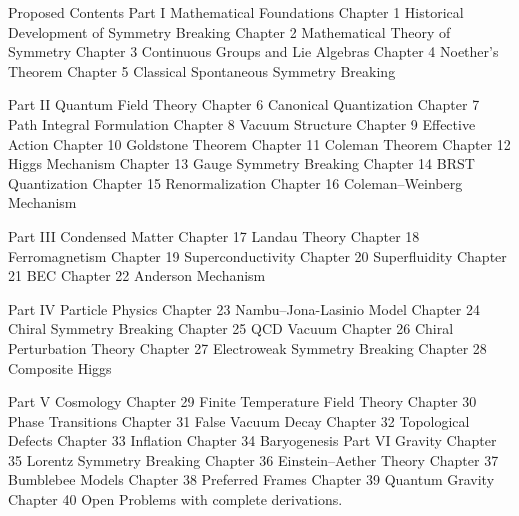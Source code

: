 Proposed Contents
Part I Mathematical Foundations
Chapter 1
Historical Development of Symmetry Breaking
Chapter 2
Mathematical Theory of Symmetry
Chapter 3
Continuous Groups and Lie Algebras
Chapter 4
Noether's Theorem
Chapter 5
Classical Spontaneous Symmetry Breaking

Part II Quantum Field Theory
Chapter 6
Canonical Quantization
Chapter 7
Path Integral Formulation
Chapter 8
Vacuum Structure
Chapter 9
Effective Action
Chapter 10
Goldstone Theorem
Chapter 11
Coleman Theorem
Chapter 12
Higgs Mechanism
Chapter 13
Gauge Symmetry Breaking
Chapter 14
BRST Quantization
Chapter 15
Renormalization
Chapter 16
Coleman–Weinberg Mechanism

Part III Condensed Matter
Chapter 17
Landau Theory
Chapter 18
Ferromagnetism
Chapter 19
Superconductivity
Chapter 20
Superfluidity
Chapter 21
BEC
Chapter 22
Anderson Mechanism

Part IV Particle Physics
Chapter 23
Nambu–Jona-Lasinio Model
Chapter 24
Chiral Symmetry Breaking
Chapter 25
QCD Vacuum
Chapter 26
Chiral Perturbation Theory
Chapter 27
Electroweak Symmetry Breaking
Chapter 28
Composite Higgs

Part V Cosmology
Chapter 29
Finite Temperature Field Theory
Chapter 30
Phase Transitions
Chapter 31
False Vacuum Decay
Chapter 32
Topological Defects
Chapter 33
Inflation
Chapter 34
Baryogenesis
Part VI Gravity
Chapter 35
Lorentz Symmetry Breaking
Chapter 36
Einstein–Aether Theory
Chapter 37
Bumblebee Models
Chapter 38
Preferred Frames
Chapter 39
Quantum Gravity
Chapter 40
Open Problems
with complete derivations.
